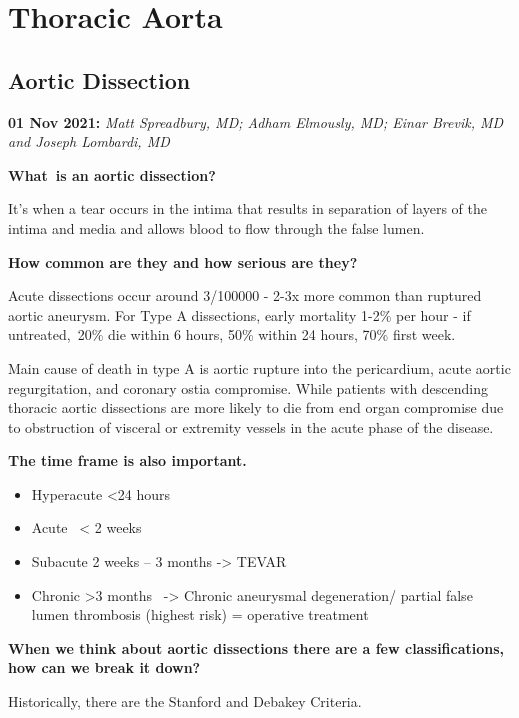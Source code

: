 \documentclass[
]{book}
\begin{document}
\hypertarget{thoracic-aorta}{%
\chapter{Thoracic Aorta}\label{thoracic-aorta}}

\hypertarget{aortic-dissection}{%
\section{Aortic Dissection}\label{aortic-dissection}}

\textbf{01 Nov 2021:} \emph{Matt Spreadbury, MD; Adham Elmously, MD; Einar Brevik,
MD and Joseph Lombardi, MD}

\textbf{What~is an aortic dissection?}

It's when a tear occurs in the intima that results in separation of
layers of the intima and media and allows blood to flow through the
false lumen.

\textbf{How common are they and how serious are they?}

Acute dissections occur around 3/100000 - 2-3x more common than ruptured
aortic aneurysm. For Type A dissections, early mortality 1-2\% per hour -
if untreated,~20\% die within 6 hours, 50\% within 24 hours, 70\% first
week.~

Main cause of death in type A is aortic rupture into the pericardium,
acute aortic regurgitation, and coronary ostia compromise. While
patients with descending thoracic aortic dissections are more likely to
die from end organ compromise due to obstruction of visceral or
extremity vessels in the acute phase of the disease.~

\textbf{The time frame is also important.}

\begin{itemize}
\item
  Hyperacute \textless24 hours~
\item
  Acute~ \textless{} 2 weeks ~
\item
  Subacute 2 weeks -- 3 months -\textgreater{} TEVAR
\item
  Chronic \textgreater3 months~ -\textgreater{} Chronic aneurysmal degeneration/ partial false
  lumen thrombosis (highest risk) = operative treatment
\end{itemize}

\textbf{When we think about aortic dissections there are a few
classifications, how can we break it down?}

Historically, there are the Stanford and Debakey Criteria.
\end{document}

